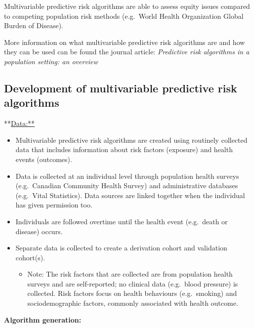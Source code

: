 \documentclass[]{book}
\providecommand{\tightlist}{%
  \setlength{\itemsep}{0pt}\setlength{\parskip}{0pt}}
\begin{document}
Multivariable predictive risk algorithms are able to assess equity
issues compared to competing population risk methods (e.g.~World Health
Organization Global Burden of Disease).

More information on what multivariable predictive risk algorithms are
and how they can be used can be found the journal article:
\emph{Predictive risk algorithms in a population setting: an overview}
\citep{PoRTover}

\subsection{Development of multivariable predictive risk
algorithms}\label{development-of-multivariable-predictive-risk-algorithms}

**\url{Data:**}

\begin{itemize}
\item
  Multivariable predictive risk algorithms are created using routinely
  collected data that includes information about risk factors (exposure)
  and health events (outcomes).
\item
  Data is collected at an individual level through population health
  surveys (e.g.~Canadian Community Health Survey) and administrative
  databases (e.g.~Vital Statistics). Data sources are linked together
  when the individual has given permission too.
\item
  Individuals are followed overtime until the health event (e.g.~death
  or disease) occurs.
\item
  Separate data is collected to create a derivation cohort and
  validation cohort(s).

  \begin{itemize}
  \tightlist
  \item
    Note: The risk factors that are collected are from population health
    surveys and are self-reported; no clinical data (e.g.~blood
    pressure) is collected. Risk factors focus on health behaviours
    (e.g.~smoking) and sociodemographic factors, commonly associated
    with health outcome.
  \end{itemize}
\end{itemize}

\textbf{Algorithm generation:}
\end{document}
